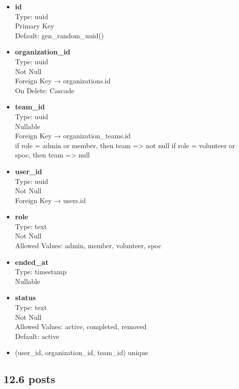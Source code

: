 \documentclass[12pt]{article}
\begin{document}
\begin{itemize}
    \item \textbf{id} \\
    Type: uuid \\
    Primary Key \\
    Default: gen\_random\_uuid()

    \item \textbf{organization\_id} \\
    Type: uuid \\
    Not Null \\
    Foreign Key → organizations.id \\
    On Delete: Cascade

    \item \textbf{team\_id} \\
    Type: uuid \\
    Nullable \\
    Foreign Key → organization\_teams.id \\
    if role = admin or member, then team => not null
    if role = volunteer or spoc, then team => null

    \item \textbf{user\_id} \\
    Type: uuid \\
    Not Null \\
    Foreign Key → users.id

    \item \textbf{role} \\
    Type: text \\
    Not Null \\
    Allowed Values: admin, member, volunteer, spoc

    \item \textbf{ended\_at} \\
    Type: timestamp \\
    Nullable 

    \item \textbf{status} \\
    Type: text \\
    Not Null \\
    Allowed Values: active, completed, removed \\
    Default: active

    \item (user\_id, organization\_id, team\_id) unique 
\end{itemize}

\subsection*{12.6 posts}
\end{document}
